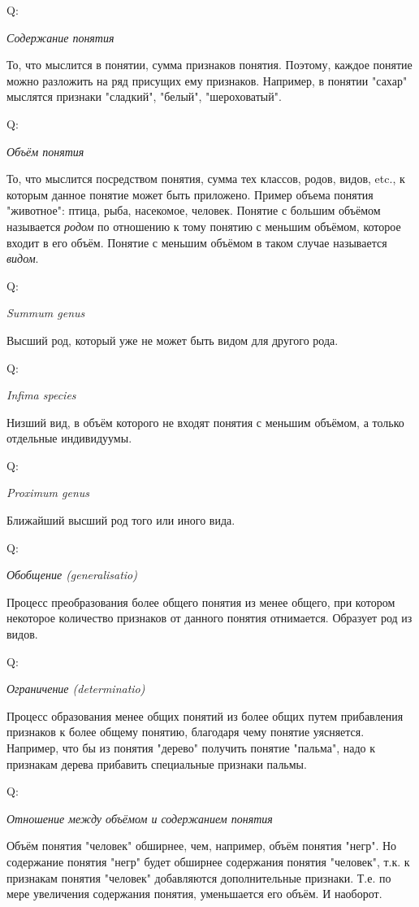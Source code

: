 \documentclass{article}
\newcommand{\note}[1]{\textit{#1}}
\newcommand{\question}[2]{
	\begin{flushright}
		Q:\hspace{2ex}\vline\hspace{2ex}
		\begin{minipage}{0.9\textwidth}
			\large
			\textit{#1}
		\end{minipage}
	\end{flushright}
	\begin{center}
		\begin{minipage}{0.95\textwidth}
			#2
		\end{minipage}
	\end{center}
}
\begin{document}
\question{Содержание понятия}{То, что мыслится в понятии, сумма признаков понятия. Поэтому, каждое понятие можно разложить на ряд присущих ему признаков. Например, в понятии "сахар" мыслятся признаки "сладкий", "белый", "шероховатый".}
\question{Объём понятия}{То, что мыслится посредством понятия, сумма тех классов, родов, видов, etc., к которым данное понятие может быть приложено. Пример объема понятия "животное": птица, рыба, насекомое, человек. Понятие с большим объёмом называется \note{родом} по отношению к тому понятию с меньшим объёмом, которое входит в его объём. Понятие с меньшим объёмом в таком случае называется \note{видом}.}
\question{Summum genus}{Высший род, который уже не может быть видом для другого рода.}
\question{Infima species}{Низший вид, в объём которого не входят понятия с меньшим объёмом, а только отдельные индивидуумы.}
\question{Proximum genus}{Ближайший высший род того или иного вида.}
\question{Обобщение (generalisatio)}{Процесс преобразования более общего понятия из менее общего, при котором некоторое количество признаков от данного понятия отнимается. Образует род из видов.}
\question{Ограничение (determinatio)}{Процесс образования менее общих понятий из более общих путем прибавления признаков к более общему понятию, благодаря чему понятие уясняется. Например, что бы из понятия "дерево" получить понятие "пальма", надо к признакам дерева прибавить специальные признаки пальмы.}
\question{Отношение между объёмом и содержанием понятия}{Объём понятия "человек" обширнее, чем, например, объём понятия "негр". Но содержание понятия "негр" будет обширнее содержания понятия "человек", т.к. к признакам понятия "человек" добавляются дополнительные признаки. Т.е. по мере увеличения содержания понятия, уменьшается его объём. И наоборот.}
\end{document}
